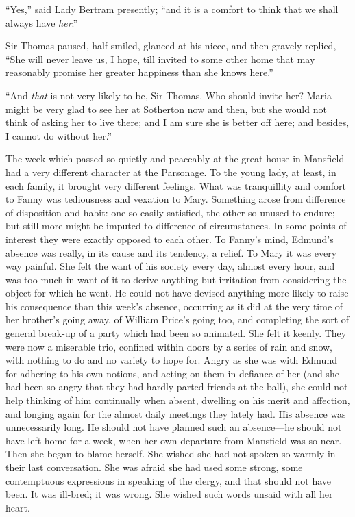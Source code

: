 \documentclass{article}
\begin{document}
``Yes,'' said Lady Bertram presently; ``and it is a comfort
to think that we shall always have \emph{her}.''

Sir Thomas paused, half smiled, glanced at his niece,
and then gravely replied, ``She will never leave us, I hope,
till invited to some other home that may reasonably promise
her greater happiness than she knows here.''

``And \emph{that} is not very likely to be, Sir Thomas.
Who should invite her?  Maria might be very glad to see her
at Sotherton now and then, but she would not think of asking
her to live there; and I am sure she is better off here;
and besides, I cannot do without her.''

The week which passed so quietly and peaceably at the
great house in Mansfield had a very different character at
the Parsonage.  To the young lady, at least, in each family,
it brought very different feelings.  What was tranquillity
and comfort to Fanny was tediousness and vexation to Mary.
Something arose from difference of disposition and habit:
one so easily satisfied, the other so unused to endure;
but still more might be imputed to difference
of circumstances.  In some points of interest they
were exactly opposed to each other.  To Fanny's mind,
Edmund's absence was really, in its cause and its tendency,
a relief.  To Mary it was every way painful.  She felt
the want of his society every day, almost every hour,
and was too much in want of it to derive anything but
irritation from considering the object for which he went.
He could not have devised anything more likely to raise
his consequence than this week's absence, occurring as
it did at the very time of her brother's going away,
of William Price's going too, and completing the sort
of general break-up of a party which had been so animated.
She felt it keenly.  They were now a miserable trio,
confined within doors by a series of rain and snow,
with nothing to do and no variety to hope for.  Angry as
she was with Edmund for adhering to his own notions,
and acting on them in defiance of her (and she had been
so angry that they had hardly parted friends at the ball),
she could not help thinking of him continually when absent,
dwelling on his merit and affection, and longing again
for the almost daily meetings they lately had.  His absence
was unnecessarily long.  He should not have planned such
an absence---he should not have left home for a week,
when her own departure from Mansfield was so near.
Then she began to blame herself.  She wished she had not
spoken so warmly in their last conversation.  She was afraid
she had used some strong, some contemptuous expressions
in speaking of the clergy, and that should not have been.
It was ill-bred; it was wrong.  She wished such words unsaid
with all her heart.
\end{document}

